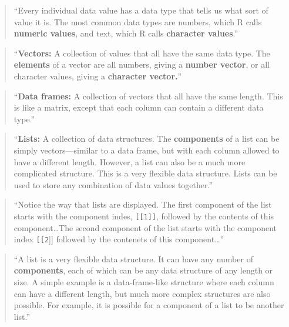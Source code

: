 \documentclass[]{tufte-book}
\begin{document}
\begin{quote}
``Every individual data value has a data type that tells us what sort of value it
is. The most common data types are numbers, which R calls \textbf{numeric values}, and
text, which R calls \textbf{character values}.'' \citep{murrell2009introduction}
\end{quote}

\begin{quote}
``\textbf{Vectors:} A collection of values that all have the same data type. The
\textbf{elements} of a vector are all numbers, giving a \textbf{number vector}, or all
character values, giving a \textbf{character vector.}'' \citep{murrell2009introduction}
\end{quote}

\begin{quote}
``\textbf{Data frames:} A collection of vectors that all have the same length. This is
like a matrix, except that each column can contain a different data type.''
\citep{murrell2009introduction}
\end{quote}

\begin{quote}
``\textbf{Lists:} A collection of data structures. The \textbf{components} of a list can
be simply vectors---similar to a data frame, but with each column allowed to have
a different length. However, a list can also be a much more complicated
structure. This is a very flexible data structure. Lists can be used to store
any combination of data values together.'' \citep{murrell2009introduction}
\end{quote}

\begin{quote}
``Notice the way that lists are displayed. The first component of the list
starts with the component indes, \texttt{{[}{[}1{]}{]}}, followed by the contents of this
component\ldots The second component of the list starts with the component
index \texttt{{[}{[}2}{]}{]} followed by the contenets of this component\ldots{}'' \citep{murrell2009introduction}
\end{quote}

\begin{quote}
``A list is a very flexible data structure. It can have any number of \textbf{components},
each of which can be any data structure of any length or size. A simple
example is a data-frame-like structure where each column can have a different
length, but much more complex structures are also possible. For example, it is
possible for a component of a list to be another list.'' \citep{murrell2009introduction}
\end{quote}
\end{document}
